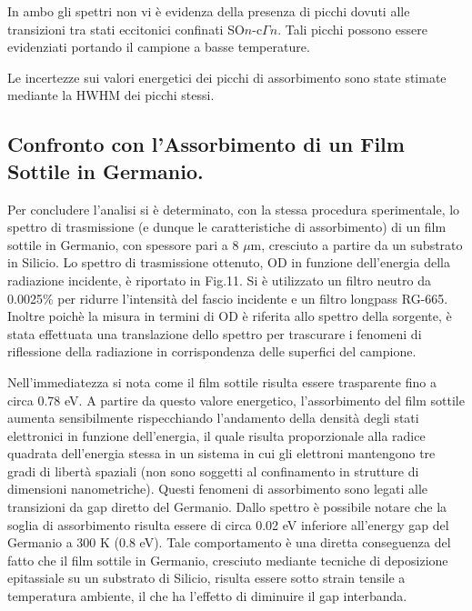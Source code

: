 \documentclass[journal]{IEEEtran}
\begin{document}
In ambo gli spettri non vi è evidenza della presenza di picchi dovuti alle transizioni tra stati eccitonici confinati SO$\textit{n}$-c$\Gamma\textit{n}$. Tali picchi possono essere evidenziati portando il campione a basse temperature.

Le incertezze sui valori energetici dei picchi di assorbimento sono state stimate mediante la HWHM dei picchi stessi.

\subsection{Confronto con l'Assorbimento di un Film Sottile in Germanio.}

Per concludere l'analisi si è determinato, con la stessa procedura sperimentale, lo spettro di trasmissione (e dunque le caratteristiche di assorbimento) di un film sottile in Germanio, con spessore pari a 8 $\mu$m, cresciuto a partire da un substrato in Silicio.
Lo spettro di trasmissione ottenuto, OD in funzione dell'energia della radiazione incidente, è riportato in Fig.11. Si è utilizzato un filtro neutro da 0.0025\% per ridurre l'intensità del fascio incidente e un filtro longpass RG-665. Inoltre poichè la misura in termini di OD è riferita allo spettro della sorgente, è stata effettuata una translazione dello spettro per trascurare i fenomeni di riflessione della radiazione in corrispondenza delle superfici del campione.



Nell'immediatezza si nota come il film sottile risulta essere trasparente fino a circa 0.78 eV. A partire da questo valore energetico, l'assorbimento del film sottile aumenta sensibilmente rispecchiando l'andamento della densità degli stati elettronici in funzione dell'energia, il quale risulta proporzionale alla radice quadrata dell'energia stessa in un sistema in cui gli elettroni mantengono tre gradi di libertà spaziali (non sono soggetti al confinamento in strutture di dimensioni nanometriche).
Questi fenomeni di assorbimento sono legati alle transizioni da gap diretto del Germanio. Dallo spettro è possibile notare che la soglia di assorbimento risulta essere di circa 0.02 eV inferiore all'energy gap del Germanio a 300 K (0.8 eV). Tale comportamento è una diretta conseguenza del fatto che il film sottile in Germanio, cresciuto mediante tecniche di deposizione epitassiale su un substrato di Silicio, risulta essere sotto strain tensile a temperatura ambiente, il che ha l'effetto di diminuire il gap interbanda.
\end{document}
